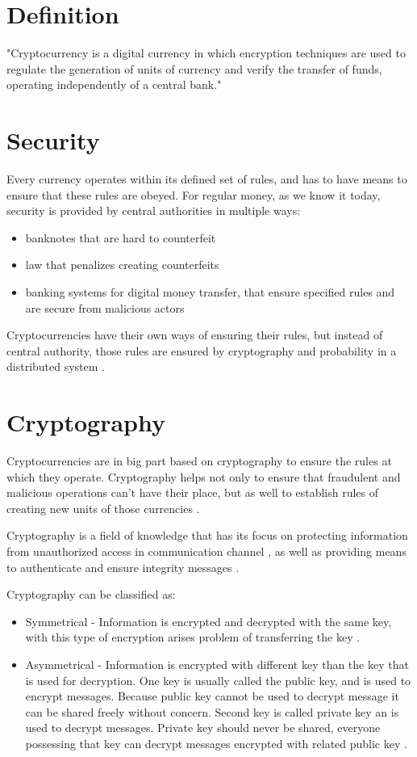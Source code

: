 \documentclass[12pt, en, eng, oneside, final]{mgr}
\begin{document}
\section{Definition}
"Cryptocurrency is a digital currency in which encryption techniques are used to regulate the generation of units of currency and verify the transfer of funds, operating independently of a central bank." \cite{crypto-def}

\section{Security}
Every currency operates within its defined set of rules, and has to have means to ensure that these rules are obeyed. For regular money, as we know it today, security is provided by central authorities in multiple ways:
\begin{itemize}
\item
banknotes that are hard to counterfeit
\item
law that penalizes creating counterfeits
\item
banking systems for digital money transfer, that ensure specified rules and are secure from malicious actors
\end{itemize}

Cryptocurrencies have their own ways of ensuring their rules, but instead of central authority, those rules are ensured by cryptography and probability in a distributed system \cite{bartek}.

\section{Cryptography}
Cryptocurrencies are in big part based on cryptography to ensure the rules at which they operate. Cryptography helps not only to ensure that fraudulent and malicious operations can't have their place, but as well to establish rules of creating new units of those currencies \cite{cryptocurrencies}. 

Cryptography is a field of knowledge that has its focus on protecting information from unauthorized access in communication channel \cite{cryptography}, as well as providing means to authenticate and ensure integrity messages \cite{cryptography-2}. 

Cryptography can be classified as:

\begin{itemize}
\item
Symmetrical - Information is encrypted and decrypted with the same key, with this type of encryption arises problem of transferring the key \cite{bartek}.
\item
Asymmetrical - Information is encrypted with different key than the key that is used for decryption. One key is usually called the public key, and is used to encrypt messages. Because public key cannot be used to decrypt message it can be shared freely without concern. Second key is called private key an is used to decrypt messages. Private key should never be shared, everyone possessing that key can decrypt messages encrypted with related public key \cite{bartek}.
\end{itemize} 
\end{document}
